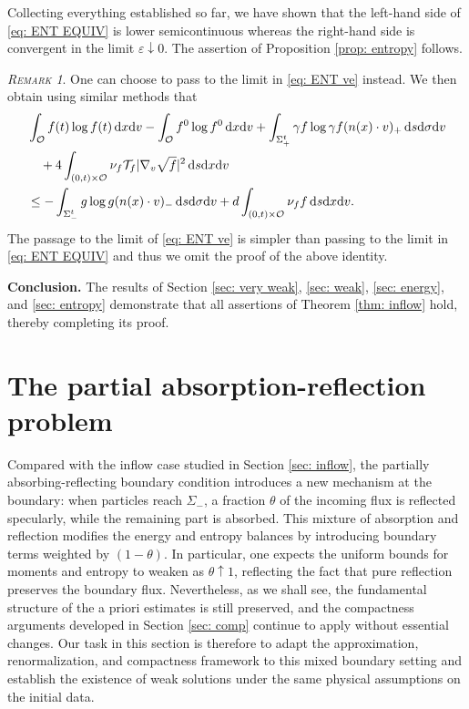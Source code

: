 \documentclass[10pt, reqno]{amsart}
\theoremstyle{plain}
\theoremstyle{definition}
\theoremstyle{remark}
\newtheorem{remark}[theorem]{\normalfont \scshape Remark}
\numberwithin{equation}{section}
\newcommand{\calO}{\mathcal O}
\newcommand{\calT}{\mathcal T}
\newcommand{\ve}{\varepsilon}
\newcommand{\dx}{\textnormal{d}x}
\newcommand{\dv}{\textnormal{d}v}
\newcommand{\ds}{\textnormal{d}s}
\newcommand{\tnd}{\textnormal{d}}
\begin{document}
Collecting everything established so far, we have shown that the left-hand side of \eqref{eq: ENT EQUIV} is lower semicontinuous whereas the right-hand side is convergent in the limit $\ve\downarrow 0$. The assertion of Proposition \ref{prop: entropy} follows.

\begin{remark}
    One can choose to pass to the limit in \eqref{eq: ENT ve} instead. We then obtain using similar methods that
    \begin{equation*}
\begin{split}
    &\int_{\calO} f(t) \log f(t) \,\dx\dv - \int_{\calO} f^0 \log f^0 \,\dx\dv + \int_{\Sigma_+^t} \gamma f \log \gamma f (n(x)\cdot v)_+ \,\ds\tnd\sigma\dv \\
        &\quad + 4\int_{(0,t)\times\calO} \nu_f \calT_f |\nabla_v \sqrt{f}|^2 \,\ds\dx\dv \\
        &\le -\int_{\Sigma_-^t} g\log g (n(x)\cdot v)_- \,\ds\tnd\sigma\dv + d \int_{(0,t)\times \calO} \nu_f f \,\ds\dx\dv.
\end{split}
\end{equation*}
The passage to the limit of \eqref{eq: ENT ve} is simpler than passing to the limit in \eqref{eq: ENT EQUIV} and thus we omit the proof of the above identity.
\end{remark}

 
\noindent \textbf{Conclusion.} The results of Section \ref{sec: very weak}, \ref{sec: weak}, \ref{sec: energy}, and \ref{sec: entropy} demonstrate that all assertions of Theorem \ref{thm: inflow} hold, thereby completing its proof.

%
%
%
%
%
%

\section{The partial absorption-reflection problem} \label{sec: reflect}

Compared with the inflow case studied in Section \ref{sec: inflow}, the partially absorbing-reflecting boundary condition introduces a new mechanism at the boundary: when particles reach $\Sigma_-$, a fraction $\theta$ of the incoming flux is reflected specularly, while the remaining part is absorbed. This mixture of absorption and reflection modifies the energy and entropy balances by introducing boundary terms weighted by $(1-\theta)$. In particular, one expects the uniform bounds for moments and entropy to weaken as $\theta \uparrow 1$, reflecting the fact that pure reflection preserves the boundary flux. Nevertheless, as we shall see, the fundamental structure of the a priori estimates is still preserved, and the compactness arguments developed in Section \ref{sec: comp} continue to apply without essential changes. Our task in this section is therefore to adapt the approximation, renormalization, and compactness framework to this mixed boundary setting and establish the existence of weak solutions under the same physical assumptions on the initial data.
\end{document}

